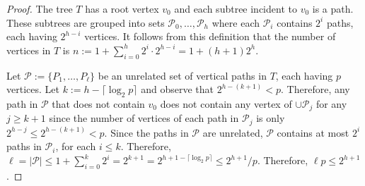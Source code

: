 \documentclass[12pt]{article}
\renewcommand{\ge}{\geqslant}
\renewcommand{\le}{\leqslant}
\theoremstyle{plain}
\theoremstyle{definition}
\begin{document}
\begin{proof}
  The tree $T$ has a root vertex $v_0$ and each subtree incident to $v_0$ is a path.  These subtrees are grouped into sets $\mathcal{P}_0,\ldots,\mathcal{P}_h$ where each $\mathcal{P}_i$ contains $2^i$ paths, each having $2^{h-i}$ vertices.  It follows from this definition that the number of vertices in $T$ is $n:=1+\sum_{i=0}^h 2^i\cdot 2^{h-i}=1+ (h+1) 2^{h}$.

  Let $\mathcal{P}:= \{P_1,\ldots,P_{\ell}\}$ be an unrelated set of vertical paths in $T$, each having $p$ vertices.  
  Let $k:=h-\lceil \log_2 p\rceil$ and observe that $2^{h-(k+1)} < p$. Therefore, any path in $\mathcal{P}$ that does not contain $v_0$ does not contain any vertex of $\cup \mathcal{P}_j$ for any $j\ge k+1$ since the number of vertices of each path in $\mathcal{P}_j$ is only $2^{h-j}\le 2^{h-(k+1)} < p$.  Since the paths in $\mathcal{P}$ are unrelated, $\mathcal{P}$ contains at most $2^i$ paths in $\mathcal{P}_i$, for each $i\le k$.  Therefore, $\ell=|\mathcal{P}|\le 1+ \sum_{i=0}^{k} 2^i=2^{k+1}=2^{h+1-\lceil\log_2 p\rceil}\le 2^{h+1}/p$.  Therefore, $\ell p \le 2^{h+1}$.
\end{proof}
    
    
\end{document}
